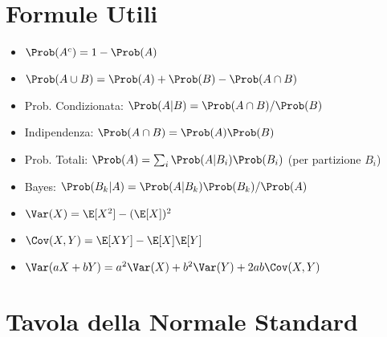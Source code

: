 \section{Formule Utili}
\begin{itemize}
    \item $\Prob(A^c) = 1 - \Prob(A)$
    \item $\Prob(A \cup B) = \Prob(A) + \Prob(B) - \Prob(A \cap B)$
    \item Prob. Condizionata: $\Prob(A|B) = \Prob(A \cap B) / \Prob(B)$
    \item Indipendenza: $\Prob(A \cap B) = \Prob(A)\Prob(B)$
    \item Prob. Totali: $\Prob(A) = \sum_i \Prob(A|B_i)\Prob(B_i)$ (per partizione $B_i$)
    \item Bayes: $\Prob(B_k|A) = \Prob(A|B_k)\Prob(B_k) / \Prob(A)$
    \item $\Var(X) = \E[X^2] - (\E[X])^2$
    \item $\Cov(X,Y) = \E[XY] - \E[X]\E[Y]$
    \item $\Var(aX+bY) = a^2\Var(X) + b^2\Var(Y) + 2ab\Cov(X,Y)$
\end{itemize}

\section{Tavola della Normale Standard}



